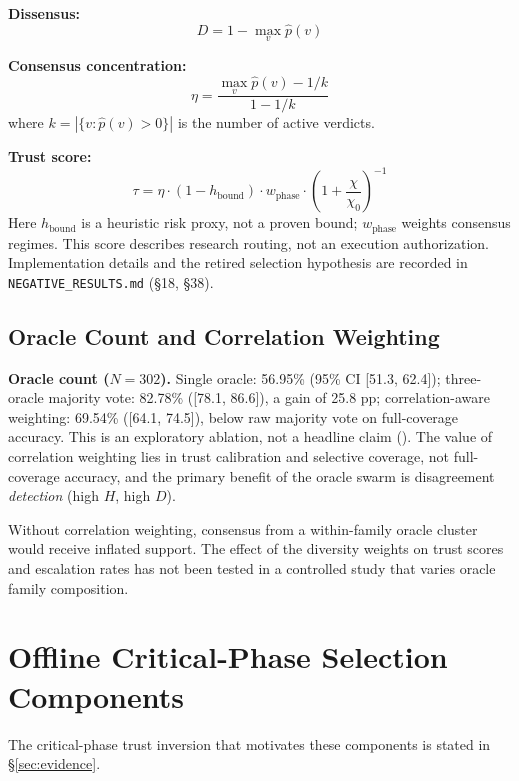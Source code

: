 \documentclass[10pt,twocolumn]{article}
\newcommand{\trust}{\tau}
\begin{document}
\textbf{Dissensus:}
\begin{equation}
  D = 1 - \max_v \hat{p}(v)
\end{equation}

\textbf{Consensus concentration:}
\begin{equation}
  \eta = \frac{\max_v \hat{p}(v) - 1/k}{1 - 1/k}
\end{equation}
where $k = |\{v : \hat{p}(v) > 0\}|$ is the number of active verdicts.

\textbf{Trust score:}
\begin{equation}
  \trust = \eta \cdot (1 - h_{\text{bound}})
           \cdot w_{\text{phase}}
           \cdot \left(1 + \frac{\chi}{\chi_0}\right)^{-1}
\end{equation}
Here $h_{\text{bound}}$ is a heuristic risk proxy, not a proven bound;
$w_{\text{phase}}$ weights consensus regimes. This score describes
research routing, not an execution authorization. Implementation details
and the retired selection hypothesis are recorded in
\texttt{NEGATIVE\_RESULTS.md} (\S18, \S38).

\subsection{Oracle Count and Correlation Weighting}
\label{app:oraclecount}

\textbf{Oracle count ($N=302$).}
Single oracle: 56.95\% (95\% CI [51.3, 62.4]); three-oracle majority
vote: 82.78\% ([78.1, 86.6]), a gain of 25.8 pp; correlation-aware
weighting: 69.54\% ([64.1, 74.5]), below raw majority vote on
full-coverage accuracy. This is an exploratory ablation, not a headline
claim (). The value of correlation weighting
lies in trust calibration and selective coverage, not full-coverage
accuracy, and the primary benefit of the oracle swarm is disagreement
\emph{detection} (high $H$, high $D$).

Without correlation weighting, consensus from a within-family oracle
cluster would receive inflated support. The effect of the diversity
weights on trust scores and escalation rates has not been tested in a
controlled study that varies oracle family composition.

\section{Offline Critical-Phase Selection Components}
\label{app:selection}

The critical-phase trust inversion that motivates these components is
stated in \S\ref{sec:evidence}.
\end{document}
